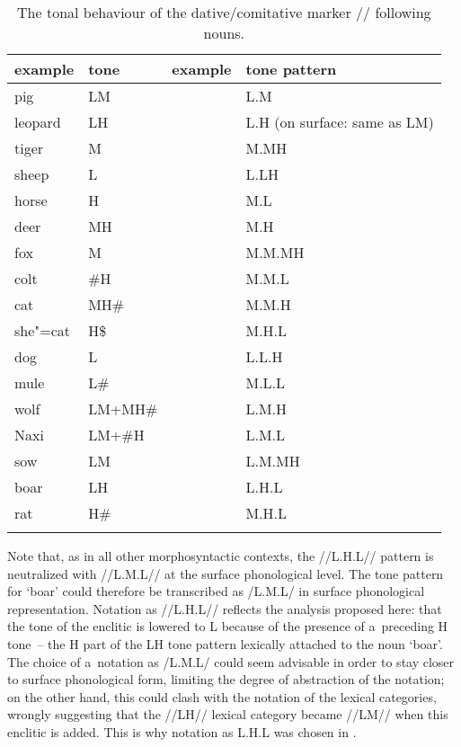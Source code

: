 \begin{table}%
\caption{\label{tab:thetonalbehaviourofthedativecomitativemarkerfollowingnouns}The tonal behaviour of the dative/comitative marker // following nouns.}
\begin{tabularx}{\textwidth}{ Q Q P{27mm} l }
\lsptoprule
	example & tone & example & tone pattern\\ \midrule
	pig & LM &  & L.M\\
	leopard & LH &  & L.H (on surface: same as LM)\\
	tiger & M &  & M.MH\\
	sheep & L &  & L.LH\\
	horse & H &  & M.L\\
	deer & MH &  & M.H\\ \addlinespace \hdashline \addlinespace
	fox & M &  & M.M.MH\\
	colt & \#H &  & M.M.L\\
	cat & MH\# &  & M.M.H\\
	she"=cat & H\$ &  & M.H.L\\
	dog & L &  & L.L.H\\
	mule & L\# &  & M.L.L\\
	wolf & LM+MH\# &  & L.M.H\\
	Naxi & LM+\#H &  & L.M.L\\
	sow & LM &  & L.M.MH\\
	boar & LH &  & L.H.L\\
	rat & H\# &  & M.H.L\\
\lspbottomrule
\end{tabularx}
\end{table}


Note that, as in all other morphosyntactic contexts, the //L.H.L// pattern is neutralized with //L.M.L// at
the surface phonological level. The tone pattern for ‘boar’ could therefore be transcribed as /L.M.L/ in surface phonological representation. Notation as //L.H.L// reflects the analysis proposed here: that the tone of the enclitic is lowered to L because of the presence of a~preceding H tone~--
the H part of the LH tone pattern lexically attached to the noun ‘boar’. The choice of a~notation as
/L.M.L/ could seem advisable in order to stay closer to surface phonological form, limiting the degree of
abstraction of the notation; on the other hand, this could
clash with the notation of the lexical categories, wrongly suggesting that the \mbox{//LH//} lexical category became \mbox{//LM//}
when this enclitic is added. This is why notation as L.H.L was chosen in .


